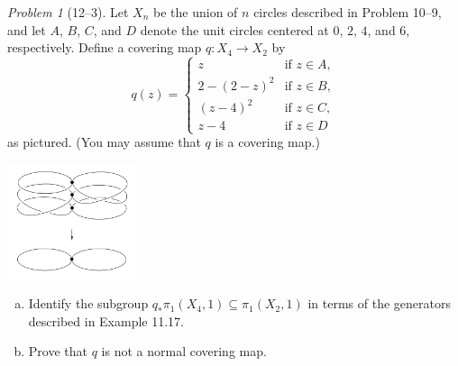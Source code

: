\documentclass[11pt,twoside]{amsart}
\theoremstyle{plain}
\theoremstyle{remark}
\newtheorem{prob}{Problem}
\theoremstyle{definition}
\theoremstyle{definition}
\begin{document}
\begin{prob}[12--3]
Let $X_n$ be the union of $n$ circles described in Problem 10--9, and let $A$, $B$, $C$, and $D$ denote the unit circles centered at $0$, $2$, $4$, and $6$, respectively. Define a covering map $q\colon X_4\to X_2$ by
\[
  q(z) =
  \begin{cases}
  z  &\text{if }z\in A,\\
  2-(2-z)^2  &\text{if }z\in B,\\
  (z-4)^2  &\text{if }z\in C,\\
  z-4  &\text{if }z\in D
  \end{cases}
\]
as pictured. (You may assume that $q$ is a covering map.)
\begin{center}
\includegraphics[width=1.5in]{fig12.9.png}
\end{center}

\begin{enumerate}[(a)]
\item Identify the subgroup $q_*\pi_1(X_4,1)\subseteq \pi_1(X_2,1)$ in terms of the generators described in Example 11.17.
\item Prove that $q$ is not a normal covering map.
\end{enumerate}
\end{prob}
\end{document}
